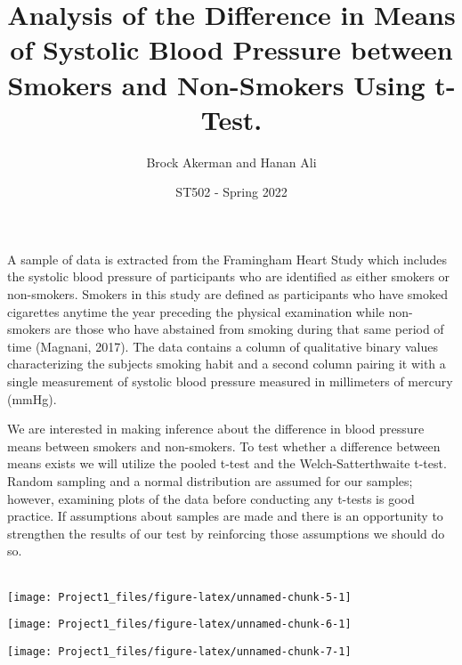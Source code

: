 \documentclass[
]{article}
\title{Analysis of the Difference in Means of Systolic Blood Pressure
between Smokers and Non-Smokers Using t-Test.}
\author{Brock Akerman and Hanan Ali}
\date{ST502 - Spring 2022}
\begin{document}
\maketitle

A sample of data is extracted from the Framingham Heart Study which
includes the systolic blood pressure of participants who are identified
as either smokers or non-smokers. Smokers in this study are defined as
participants who have smoked cigarettes anytime the year preceding the
physical examination while non-smokers are those who have abstained from
smoking during that same period of time (Magnani, 2017). The data
contains a column of qualitative binary values characterizing the
subjects smoking habit and a second column pairing it with a single
measurement of systolic blood pressure measured in millimeters of
mercury (mmHg).

We are interested in making inference about the difference in blood
pressure means between smokers and non-smokers. To test whether a
difference between means exists we will utilize the pooled t-test and
the Welch-Satterthwaite t-test. Random sampling and a normal
distribution are assumed for our samples; however, examining plots of
the data before conducting any t-tests is good practice. If assumptions
about samples are made and there is an opportunity to strengthen the
results of our test by reinforcing those assumptions we should do so.\\
~\\

\begin{center}\texttt{[image: Project1\_files/figure-latex/unnamed-chunk-5-1]} \end{center}

\hfill\break
\hfill\break

\begin{center}\texttt{[image: Project1\_files/figure-latex/unnamed-chunk-6-1]} \end{center}

\hfill\break
\hfill\break

\begin{center}\texttt{[image: Project1\_files/figure-latex/unnamed-chunk-7-1]} \end{center}

\hfill\break
\hfill\break
\end{document}
